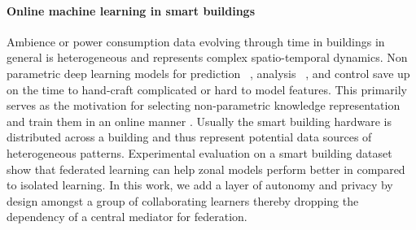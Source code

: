 \paragraph{Online machine learning in smart buildings} 
 
Ambience or power consumption data evolving through time in buildings in general is heterogeneous and represents complex spatio-temporal dynamics. 
Non parametric deep learning models for prediction ~\cite{garg2000smart},    analysis ~\cite{wong2005intelligent}, and control \cite{gupta_energy-efficient_2021} save up on the time to hand-craft complicated or hard to model features.
This primarily serves as the motivation for selecting non-parametric knowledge representation and train them in an online manner \cite{abdel2019data}. 
Usually the smart building hardware is distributed across a building and thus represent potential data sources of heterogeneous patterns.
Experimental evaluation on a smart building dataset show that federated learning \cite{mitra2021impact} can help zonal models perform better in compared to isolated learning.
In this work, we add a layer of autonomy and privacy by design amongst a group of collaborating learners thereby dropping the dependency of a central mediator for federation.



 

